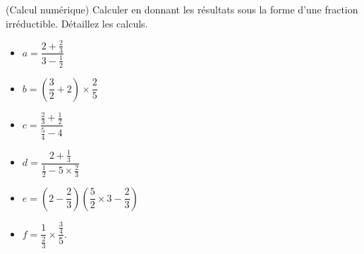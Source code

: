 \documentclass[12pt,
addpoints,
answers,
fleqn
]{exam}
\begin{document}
\begin{questions}

    \question (Calcul numérique) Calculer en donnant les résultats sous la forme d'une fraction irréductible. Détaillez les calculs.
    \begin{multicols}{3}
        \begin{itemize}
            \item[] $a= \dfrac{2+\frac{2}{3}}{3-\frac{1}{2}}$ \\
            \item[] $b=\left( \dfrac{3}{2}+2\right)\times \dfrac{2}{5}$ \\
            \item[] $c=\dfrac{\frac{2}{3}+\frac{1}{2}}{\frac{5}{4}-4}$ \\
            \item[] $d=\dfrac{2+\frac{1}{3}}{\frac{1}{2}-5\times\frac{2}{3}}$ \\
            \item[] $ e=\left(2 - \dfrac{2}{3}\right)\left(\dfrac{5}{2}\times 3 - \dfrac{2}{3}\right)$
            \item[] $f=\dfrac{1}{\frac{2}{3}}\times\dfrac{\frac{3}{4}}{5}.$
        \end{itemize}
    \end{multicols}


\end{questions}
\end{document}
